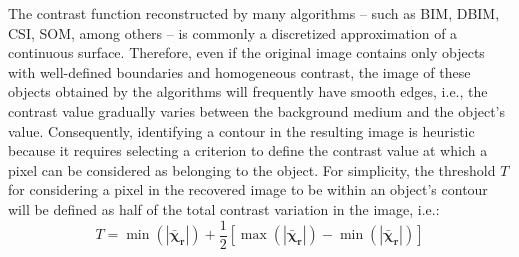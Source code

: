 \documentclass{IEEEtran}
\newcommand{\Xr}{\boldsymbol{\bar{\chi}_r}}
\begin{document}
			
			The contrast function reconstructed by many algorithms -- such as BIM, DBIM, CSI, SOM, among others -- is commonly a discretized approximation of a continuous surface. Therefore, even if the original image contains only objects with well-defined boundaries and homogeneous contrast, the image of these objects obtained by the algorithms will frequently have smooth edges, i.e., the contrast value gradually varies between the background medium and the object's value. Consequently, identifying a contour in the resulting image is heuristic because it requires selecting a criterion to define the contrast value at which a pixel can be considered as belonging to the object. For simplicity, the threshold $T$ for considering a pixel in the recovered image to be within an object's contour will be defined as half of the total contrast variation in the image, i.e.:
			\begin{equation}
				T = \min(|\Xr|) + \frac{1}{2} \left[\max(|\Xr|)-\min(|\Xr|)\right]
			\end{equation}
		
			
\end{document}
